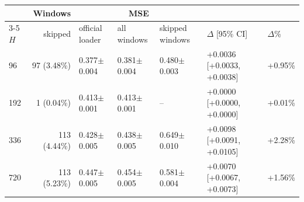 \begin{tabular}{@{}lrlllll@{}}
\toprule
 & Windows & \multicolumn{3}{c}{MSE} & & \\
\cmidrule(lr){3-5}
$H$ & skipped & official loader & all windows & skipped windows & $\Delta$ [95\% CI] & $\Delta$\% \\
\midrule
96 & 97 (3.48\%) & 0.377$\pm$0.004 & 0.381$\pm$0.004 & 0.480$\pm$0.003 & +0.0036 [+0.0033, +0.0038] & +0.95\% \\
192 & 1 (0.04\%) & 0.413$\pm$0.001 & 0.413$\pm$0.001 & -- & +0.0000 [+0.0000, +0.0000] & +0.01\% \\
336 & 113 (4.44\%) & 0.428$\pm$0.005 & 0.438$\pm$0.005 & 0.649$\pm$0.010 & +0.0098 [+0.0091, +0.0105] & +2.28\% \\
720 & 113 (5.23\%) & 0.447$\pm$0.005 & 0.454$\pm$0.005 & 0.581$\pm$0.004 & +0.0070 [+0.0067, +0.0073] & +1.56\% \\
\bottomrule
\end{tabular}
